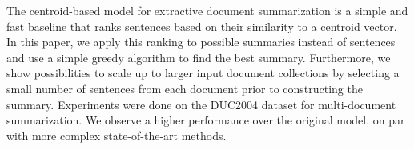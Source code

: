The centroid-based model for extractive document summarization is a simple and fast baseline that ranks sentences based on their similarity to a centroid vector. In this paper, we apply this ranking to possible summaries instead of sentences and use a simple greedy algorithm to find the best summary. Furthermore, we show possibilities to scale up to larger input document collections by selecting a small number of sentences from each document prior to constructing the summary. Experiments were done on the DUC2004 dataset for multi-document summarization. We observe a higher performance over the original model, on par with more complex state-of-the-art methods.
